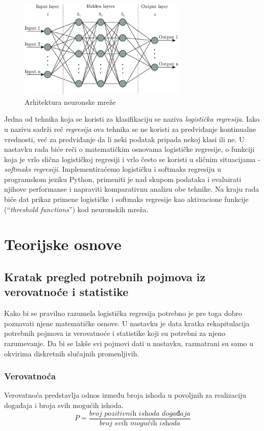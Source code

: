 \documentclass[a4paper,12pt]{report}
\begin{document}
\begin{figure}[ht]
	\centering
	\includegraphics[width=8cm]{neuronske_mreze.png}
	\caption{Arhitektura neuronske mreže}\label{fig:prettypic}
\end{figure}

Jedna od tehnika koja se koristi za klasifikaciju se naziva \textit{logistička regresija}. Iako u nazivu sadrži reč \textit{regresija} ova tehnika se ne koristi za predviđanje kontinualne vrednosti, već za predviđanje da li neki podatak pripada nekoj klasi ili ne. U nastavku rada biće reči o matematičkim osnovama logističke regresije, o funkciji koja je vrlo slična logističkoj regresiji i vrlo često se koristi u sličnim situacijama - \textit{softmaks regresiji}. Implementiraćemo logističku i softmaks regresiju u programskom jeziku Python, primeniti je nad skupom podataka i evaluirati njihove performanse i napraviti komparativnu analizu obe tehnike. Na kraju rada biće dat prikaz primene logističke i softmaks regresije kao 
aktivacione funkcije (\enquote {\textit{threshold functions}}) kod neuronskih mreža.
\chapter{Teorijske osnove}

\section{Kratak pregled potrebnih pojmova iz verovatnoće i statistike}
Kako bi se pravilno razumela logistička regresija potrebno je pre toga dobro poznavati njene matematičke osnove. U nastavku je data kratka rekapitulacija potrebnih pojmova iz verovatnoće i statistike koji su potrebni za njeno razumevanje. Da bi se lakše svi pojmovi dati u nastavku, razmatrani su samo u okvirima diskretnih slučajnih promenljivih.\\

\subsection{Verovatnoća} 
Verovatnoća predstavlja odnos između broja ishoda u povoljnih za realizaciju događaja i broja svih mogućih ishoda. 
\begin{equation} \label{eq:1}
	P = \frac{\textit{broj pozitivnih ishoda događaja}}{\textit{broj svih mogućih ishoda}} 
 \end{equation}
 
\end{document}
